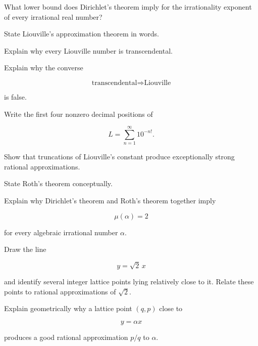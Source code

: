 \begin{exercise}[2]
What lower bound does Dirichlet's theorem imply for the irrationality
exponent of every irrational real number?
\end{exercise}

\begin{exercise}[2]
State Liouville's approximation theorem in words.
\end{exercise}

\begin{exercise}[2]
Explain why every Liouville number is transcendental.
\end{exercise}

\begin{exercise}[2]
Explain why the converse

\[
\text{transcendental}
\Longrightarrow
\text{Liouville}
\]

is false.
\end{exercise}

\begin{exercise}[2]
Write the first four nonzero decimal positions of

\[ L=\sum_{n=1}^{\infty}10^{-n!}. \]
\end{exercise}

\begin{exercise}[3]
Show that truncations of Liouville's constant produce exceptionally strong
rational approximations.
\end{exercise}

\begin{exercise}[2]
State Roth's theorem conceptually.
\end{exercise}

\begin{exercise}[3]
Explain why Dirichlet's theorem and Roth's theorem together imply

\[ \mu(\alpha)=2 \]

for every algebraic irrational number \(\alpha\).
\end{exercise}

\begin{exercise}[2]
Draw the line

\[ y=\sqrt2\,x \]

and identify several integer lattice points lying relatively close to it.
Relate these points to rational approximations of \(\sqrt2\).
\end{exercise}

\begin{exercise}[2]
Explain geometrically why a lattice point \((q,p)\) close to

\[ y=\alpha x \]

produces a good rational approximation \(p/q\) to \(\alpha\).
\end{exercise}


